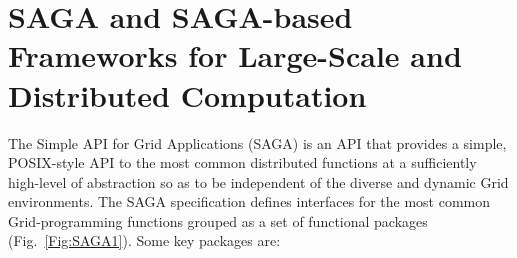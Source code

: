 \documentclass{rspublic}
\begin{document}



\section{SAGA and SAGA-based Frameworks for Large-Scale and
  Distributed Computation}\label{Sec:SAGA}


The Simple API for Grid Applications (SAGA) is an API
that provides a simple, POSIX-style API to the most common distributed
functions at a sufficiently high-level of abstraction so as to be
independent of the diverse and dynamic Grid environments. The SAGA
specification defines interfaces for the most common Grid-programming
functions grouped as a set of functional packages
(Fig.~\ref{Fig:SAGA1}). Some key packages are:
\end{document}
